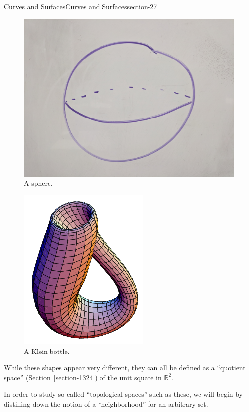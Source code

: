 \documentclass[oneside,10pt,]{article}
\begin{document}
\begin{sectionptx}{Curves and Surfaces}{}{Curves and Surfaces}{}{}{section-27}
\begin{figure}
\includegraphics[width=1\linewidth]{images/sphere.jpg}
\caption{A sphere.\label{figure-113}}
\end{figure}
\begin{figure}
\centering
\includegraphics[width=1\linewidth]{images/klein-bottle.png}
\caption{A Klein bottle.\label{figure-116}}
\end{figure}
\hypertarget{p-119}{}%
While these shapes appear very different, they can all be defined as a ``quotient space'' (\hyperref[section-1324]{Section~\ref{section-1324}}) of the unit square in \(\mathbb R^2\).%
\par
\hypertarget{p-123}{}%
In order to study so-called ``topological spaces'' such as these, we will begin by distilling down the notion of a ``neighborhood'' for an arbitrary set.%
\end{sectionptx}
\end{document}
